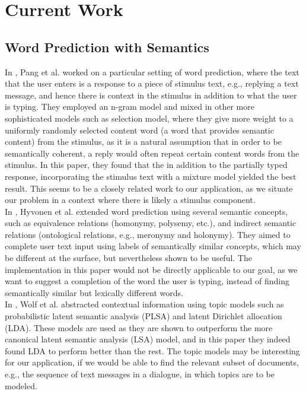 \documentclass[14pt, oneside]{article}   	%
\begin{document}
%
%
%
%
%
%
%
%
\section{Current Work}
\subsection{Word Prediction with Semantics}
In \cite{pang2012revisiting},
Pang et al. worked on a particular setting of word prediction,
where the text that the user enters is a response to a piece of stimulus text, e.g., replying a text message,
and hence there is context in the stimulus in addition to what the user is typing.
They employed an n-gram model and mixed in other more sophisticated models such as
selection model, where they give more weight to a uniformly randomly selected content word
(a word that provides semantic content)
from the stimulus, as it is a natural assumption that in order to be semantically coherent,
a reply would often repeat certain content words from the stimulus.
In this paper, they found that the in addition to the partially typed response,
incorporating the stimulus text with a mixture model yielded the best result.
This seems to be a closely related work to our application,
as we situate our problem in a context where there is likely a stimulus component.\\

In \cite{hyvonen2006semantic},
Hyvonen et al. extended word prediction using several semantic concepts,
such as equivalence relations (homonymy, polysemy, etc.),
and indirect semantic relations (ontological relations, e.g., meronymy and holonymy).
They aimed to complete user text input using labels of semantically similar concepts,
which may be different at the surface, but nevertheless shown to be useful.
The implementation in this paper would not be directly applicable to our goal,
as we want to suggest a completion of the word the user is typing,
instead of finding semantically similar but lexically different words.\\

In \cite{wolf2006use},
Wolf et al. abstracted contextual information using topic models
such as probabilistic latent semantic analysis (PLSA) and latent Dirichlet allocation (LDA).
These models are used as they are shown to outperform the more canonical latent semantic analysis (LSA) model,
and in this paper they indeed found LDA to perform better than the rest.
The topic models may be interesting for our application,
if we would be able to find the relevant subset of documents,
e.g., the sequence of text messages in a dialogue, in which topics are to be modeled.\\
\end{document}
